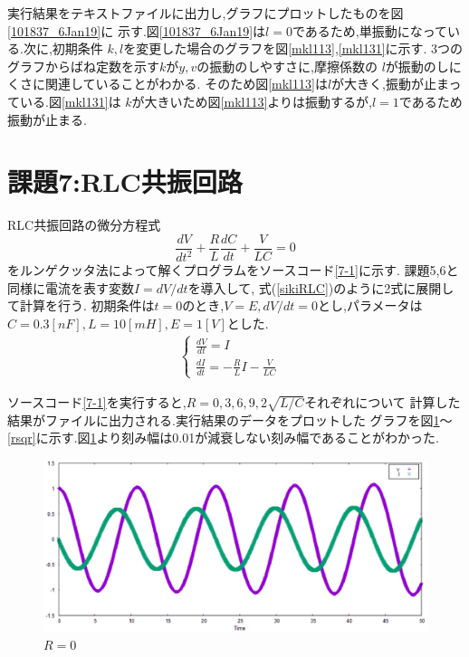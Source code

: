 実行結果をテキストファイルに出力し,グラフにプロットしたものを図\ref{101837_6Jan19}に
示す.図\ref{101837_6Jan19}は$l=0$であるため,単振動になっている.次に,初期条件
$k,l$を変更した場合のグラフを図\ref{mkl113},\ref{mkl131}に示す.
3つのグラフからばね定数を示す$k$が$y,v$の振動のしやすさに,摩擦係数の
$l$が振動のしにくさに関連していることがわかる.
そのため図\ref{mkl113}は$l$が大きく,振動が止まっている.図\ref{mkl131}は
$k$が大きいため図\ref{mkl113}よりは振動するが,$l=1$であるため振動が止まる.
\section{課題7:RLC共振回路}
RLC共振回路の微分方程式
\begin{equation*}
\frac{dV}{dt^2}+\frac{R}{L}\frac{dC}{dt}+\frac{V}{LC}=0
\end{equation*}
をルンゲクッタ法によって解くプログラムをソースコード\ref{7-1}に示す.
課題5,6と同様に電流を表す変数$I=dV/dt$を導入して,
式(\ref{sikiRLC})のように2式に展開して計算を行う.
初期条件は$t=0$のとき,$V=E,dV/dt=0$とし,パラメータは$
C=0.3[nF],L=10[mH],E=1[V]$とした.
\begin{eqnarray}
  \begin{cases}
\frac{dV}{dt}=I&\\
\frac{dI}{dt}=-\frac{R}{L}I-\frac{V}{LC}&
 \label{sikiRLC}
  \end{cases}
\end{eqnarray}

ソースコード\ref{7-1}を実行すると,$R=0,3,6,9,2\sqrt{L/C}$それぞれについて
計算した結果がファイルに出力される.実行結果のデータをプロットした
グラフを図\ref{r0}～\ref{rsqr}に示す.図\ref{r0}より刻み幅は0.01が減衰しない刻み幅であることがわかった.
\begin{figure}[htbp]
\centering
\includegraphics[scale=0.7]{./img/kadai7_R0.eps}
\caption{$R=0$}
\label{r0}
\end{figure}
